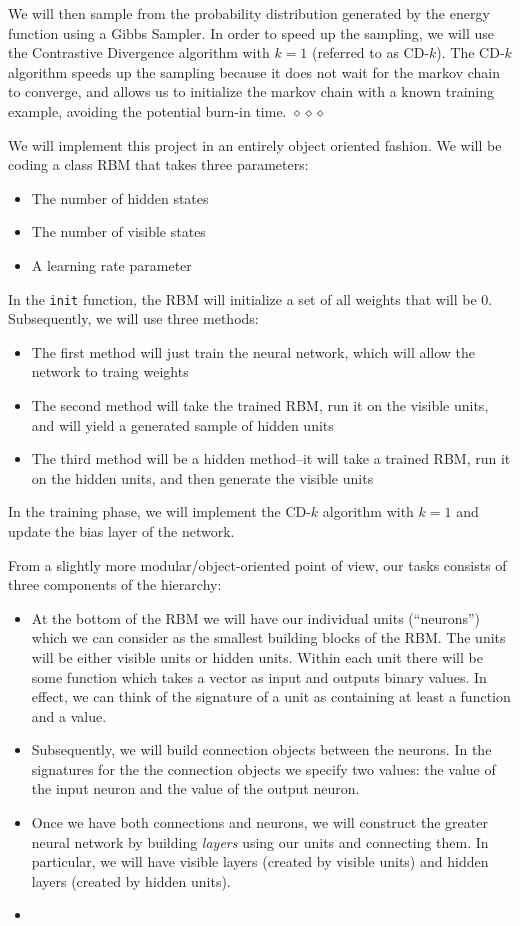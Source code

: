 \documentclass[12pt]{article}
\begin{document}
We will then sample from the probability distribution generated by the energy function using a Gibbs Sampler. In order to speed up the sampling, we will use the Contrastive Divergence algorithm with $k=1$ (referred to as CD-$k$). The CD-$k$ algorithm speeds up the sampling because it does not wait for the markov chain to converge, and allows us to initialize the markov chain with a known training example, avoiding the potential burn-in time. $\diamond \diamond \diamond$

We will implement this project in an entirely object oriented fashion. We will be coding a class RBM that takes three parameters:
\begin{itemize}
  \item The number of hidden states
  \item The number of visible states
  \item A learning rate parameter
\end{itemize}

In the \texttt{init} function, the RBM will initialize a set of all weights that will be 0. Subsequently, we will use three methods:
\begin{itemize}
  \item The first method will just train the neural network, which will allow the network to traing weights
  \item The second method will take the trained RBM, run it on the visible units, and will yield a generated sample of hidden units
  \item The third method will be a hidden method--it will take a trained RBM, run it on the hidden units, and then generate the visible units
\end{itemize}

In the training phase, we will implement the CD-$k$ algorithm with $k = 1$ and update the bias layer of the network. 

From a slightly more modular/object-oriented point of view, our tasks consists of three components of the hierarchy:
\begin{itemize}
  \item At the bottom of the RBM we will have our individual units (``neurons'') which we can consider as the smallest building blocks of the RBM. The units will be either visible units or hidden units. Within each unit there will be some function which takes a vector as input and outputs binary values. In effect, we can think of the signature of a unit as containing at least a function and a value.
  \item Subsequently, we will build connection objects between the neurons. In the signatures for the the connection objects we specify two values: the value of the input neuron and the value of the output neuron.
  \item Once we have both connections and neurons, we will construct the greater neural network by building \textit{layers} using our units and connecting them. In particular, we will have visible layers (created by visible units) and hidden layers (created by hidden units).
  \item 
\end{itemize}
\end{document}
